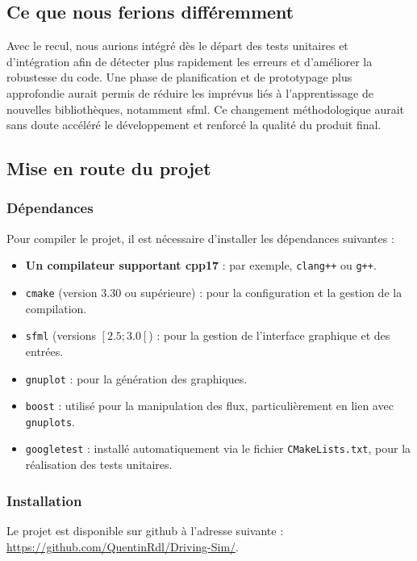 \subsection{Ce que nous ferions différemment}\label{subsec:ce-que-nous-ferions-differemment}
Avec le recul, nous aurions intégré dès le départ des tests unitaires et d'intégration afin de détecter plus rapidement les erreurs et d'améliorer la robustesse du code.
Une phase de planification et de prototypage plus approfondie aurait permis de réduire les imprévus liés à l'apprentissage de nouvelles bibliothèques, notamment \gls{sfml}\@.
Ce changement méthodologique aurait sans doute accéléré le développement et renforcé la qualité du produit final.

\subsection{Mise en route du projet}\label{subsec:mise-en-route-du-projet}

\subsubsection{Dépendances}\label{subsubsec:dependances}
Pour compiler le projet, il est nécessaire d'installer les dépendances suivantes :
\begin{itemize}
    \item \textbf{Un compilateur supportant \gls{cpp}17} : par exemple, \texttt{clang++} ou \texttt{g++}.
    \item \texttt{\gls{cmake}} (version 3.30 ou supérieure) : pour la configuration et la gestion de la compilation.
    \item \texttt{\gls{sfml}} (versions $\left[2.5 ; 3.0\left[$) : pour la gestion de l'interface graphique et des entrées.
    \item \texttt{\gls{gnuplot}} : pour la génération des graphiques.
    \item \texttt{\gls{boost}} : utilisé pour la manipulation des flux, particulièrement en lien avec \texttt{\glspl{gnuplot}}.
    \item \texttt{\gls{googletest}} : installé automatiquement via le fichier \texttt{CMakeLists.txt}, pour la réalisation des tests unitaires.
\end{itemize}
\newpage
\subsubsection{Installation}\label{subsubsec:installation}
Le projet est disponible sur \gls{github} à l'adresse suivante : \url{https://github.com/QuentinRdl/Driving-Sim/}.


